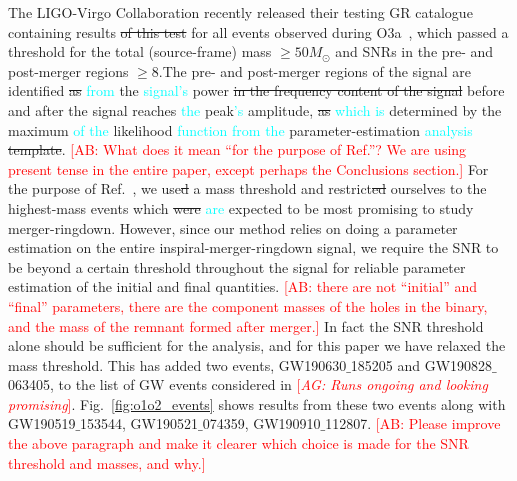 \documentclass[twocolumn,prd,aps,superscriptaddress,preprintnumbers,tightenlines,showpacs,nofootinbib,eqsecnum,amsfonts,amsmath]{revtex4-1}
\newcommand{\abhi}[1]{\textcolor{red}{[\textit{AG: #1}]}}
\newcommand{\ab}[1]{\textcolor{cyan}{#1}}
\newcommand{\comment}[1]{\textcolor{red}{[#1]}}
\newcommand{\Mo}{M_{\odot}}
\begin{document}
The LIGO-Virgo Collaboration recently released their testing GR
catalogue containing results \sout{of this test} for all events observed
during O3a~\cite{Abbott:2020jks}, which passed a threshold for the
total (source-frame) mass $\geq 50 \Mo$ and SNRs in the pre- and
post-merger regions $\geq 8$.The pre- and post-merger regions of the
signal are identified \sout{as} \ab{from} the \ab{signal's} power \sout{in the frequency content of the
signal} before and after the signal reaches \ab{the} peak\ab{'s} 
amplitude, \sout{as} \ab{which is} determined by the maximum \ab{of the} 
likelihood \ab{function}  \ab{from the} parameter-estimation \ab{analysis} \sout{template}.
\comment{AB: What does it mean ``for the purpose of Ref.''? We are using present tense in the 
entire paper, except perhaps the Conclusions section.} 
For the purpose of Ref.~\cite{Abbott:2020jks}, we use\sout{d} a mass
threshold and restrict\sout{ed} ourselves to the highest-mass events which
\sout{were} \ab{are} expected to be most promising to study merger-ringdown. However,
since our method relies on doing a parameter estimation on the entire
inspiral-merger-ringdown signal, we require the SNR to be beyond a
certain threshold throughout the signal for reliable parameter
estimation of the initial and final quantities. \comment{AB: there are not ``initial'' and ``final'' parameters, 
there are the component masses of the holes in the binary, and the 
mass of the remnant formed after merger.} In fact the SNR
threshold alone should be sufficient for the analysis, and for this
paper we have relaxed the mass threshold. This has added two events,
GW190630$\_$185205 and GW190828$\_$063405, to the list of GW events
considered in \cite{Abbott:2020jks} \abhi{Runs ongoing and looking
  promising}. Fig.~\ref{fig:o1o2_events} shows results from these two
events along with GW190519$\_$153544, GW190521$\_$074359,
GW190910$\_$112807. \comment{AB: Please improve the above paragraph 
and make it clearer which choice is made for the SNR threshold and 
masses, and why.}
\end{document}
